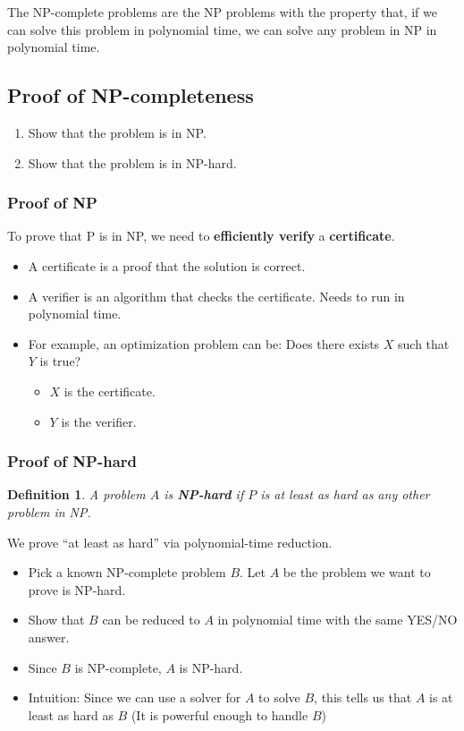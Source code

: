 \documentclass[conference]{IEEEtran}
\newtheorem*{definition}{Definition}
\begin{document}
The NP-complete problems are the NP problems with the property that, if we can solve this problem in polynomial time, we can solve any problem in NP in polynomial time. 
\subsection{Proof of NP-completeness}
\begin{enumerate}
    \item Show that the problem is in NP.
    \item Show that the problem is in NP-hard.
\end{enumerate}
\subsubsection{Proof of NP}
To prove that P is in NP, we need to \textbf{efficiently verify} a \textbf{certificate}.\begin{itemize}
    \item A certificate is a proof that the solution is correct.
    \item A verifier is an algorithm that checks the certificate. Needs to run in polynomial time.
    \item For example, an optimization problem can be: Does there exists $X$ such that $Y$ is true?\begin{itemize}
        \item $X$ is the certificate.
        \item $Y$ is the verifier.
    \end{itemize}
\end{itemize}
\subsubsection{Proof of NP-hard}
\begin{definition}
    A problem $A$ is \textbf{NP-hard} if $P$ is at least as hard as any other problem in NP.
\end{definition}
We prove ``at least as hard'' via polynomial-time reduction. 
\begin{itemize}
    \item Pick a known NP-complete problem $B$. Let $A$ be the problem we want to prove is NP-hard.
    \item Show that $B$ can be reduced to $A$ in polynomial time with the same YES/NO answer.
    \item Since $B$ is NP-complete, $A$ is NP-hard.
    \item Intuition: Since we can use a solver for $A$ to solve $B$, this tells us that $A$ is at least as hard as $B$ (It is powerful enough to handle $B$)
\end{itemize}
\end{document}
